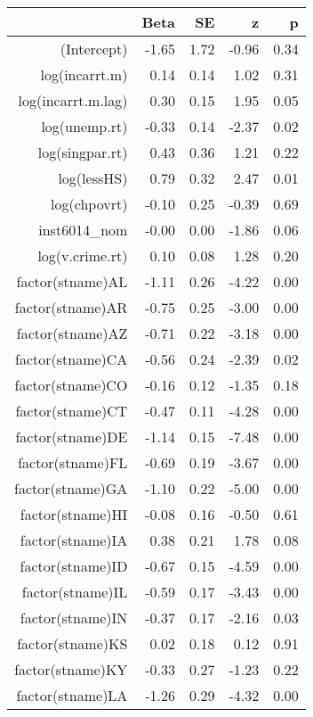 \begin{table}[ht]
\centering
\begin{tabular}{rrrrr}
  \hline
 & Beta & SE & z & p \\ 
  \hline
(Intercept) & -1.65 & 1.72 & -0.96 & 0.34 \\ 
  log(incarrt.m) & 0.14 & 0.14 & 1.02 & 0.31 \\ 
  log(incarrt.m.lag) & 0.30 & 0.15 & 1.95 & 0.05 \\ 
  log(unemp.rt) & -0.33 & 0.14 & -2.37 & 0.02 \\ 
  log(singpar.rt) & 0.43 & 0.36 & 1.21 & 0.22 \\ 
  log(lessHS) & 0.79 & 0.32 & 2.47 & 0.01 \\ 
  log(chpovrt) & -0.10 & 0.25 & -0.39 & 0.69 \\ 
  inst6014\_nom & -0.00 & 0.00 & -1.86 & 0.06 \\ 
  log(v.crime.rt) & 0.10 & 0.08 & 1.28 & 0.20 \\ 
  factor(stname)AL & -1.11 & 0.26 & -4.22 & 0.00 \\ 
  factor(stname)AR & -0.75 & 0.25 & -3.00 & 0.00 \\ 
  factor(stname)AZ & -0.71 & 0.22 & -3.18 & 0.00 \\ 
  factor(stname)CA & -0.56 & 0.24 & -2.39 & 0.02 \\ 
  factor(stname)CO & -0.16 & 0.12 & -1.35 & 0.18 \\ 
  factor(stname)CT & -0.47 & 0.11 & -4.28 & 0.00 \\ 
  factor(stname)DE & -1.14 & 0.15 & -7.48 & 0.00 \\ 
  factor(stname)FL & -0.69 & 0.19 & -3.67 & 0.00 \\ 
  factor(stname)GA & -1.10 & 0.22 & -5.00 & 0.00 \\ 
  factor(stname)HI & -0.08 & 0.16 & -0.50 & 0.61 \\ 
  factor(stname)IA & 0.38 & 0.21 & 1.78 & 0.08 \\ 
  factor(stname)ID & -0.67 & 0.15 & -4.59 & 0.00 \\ 
  factor(stname)IL & -0.59 & 0.17 & -3.43 & 0.00 \\ 
  factor(stname)IN & -0.37 & 0.17 & -2.16 & 0.03 \\ 
  factor(stname)KS & 0.02 & 0.18 & 0.12 & 0.91 \\ 
  factor(stname)KY & -0.33 & 0.27 & -1.23 & 0.22 \\ 
  factor(stname)LA & -1.26 & 0.29 & -4.32 & 0.00 \\ 

\end{tabular}
\end{table}
